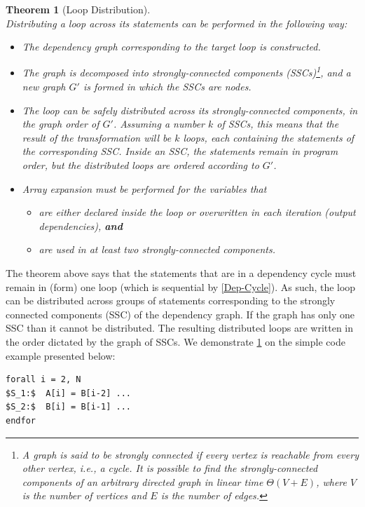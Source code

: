 \documentclass[acmsmall,review]{acmart}\settopmatter{printfolios=true,printccs=false,printacmref=false}
\newtheorem{mytheo}{Theorem}
\begin{document}
\begin{mytheo}[Loop Distribution]\label{Loop-Distrib}
$\mbox{ }$\\
Distributing a loop across its statements can be performed
in the following way:
\begin{itemize}
    \item[1.] The dependency graph corresponding to the target loop
        is constructed.
    \item[2.] The graph is decomposed into strongly-connected components 
            (SSCs)\footnote{
            A graph is said to be strongly connected if every vertex 
            is reachable from every other vertex, i.e., a cycle.
            It is possible to find the strongly-connected components
            of an arbitrary directed graph in linear time $\Theta(V+E)$,
            where $V$ is the number of vertices and $E$ is the number of
            edges.
        }, and a new graph $G'$ is formed in which the SSCs are nodes. 
    \item[3.] The loop can be safely distributed across its strongly-connected
        components, in the graph order of $G'$.
        Assuming a number $k$ of SSCs, this means that the result of the
        transformation will be $k$ loops, each containing the statements
        of the corresponding SSC. Inside an SSC, the statements remain in
        program order, but the distributed loops are ordered according to
        $G'$. 
    \item[4.] Array expansion must be performed for the variables that
        \begin{itemize}
            \item are either declared inside the loop or overwritten
                in each iteration (output dependencies), \textbf{\em and}
            \item are used in at least two strongly-connected components.
        \end{itemize} 
\end{itemize}
\end{mytheo}

The theorem above says that the statements that are in a dependency 
cycle must remain in (form) one loop (which is sequential by 
\cref{Dep-Cycle}). As such, the loop can be distributed across
groups of statements corresponding to the strongly connected 
components (SSC) of the dependency graph. If the graph has only one
SSC than it cannot be distributed.  The resulting distributed loops
are written in the order dictated by the graph of SSCs. 
%
We demonstrate \cref{Loop-Distrib} on the simple code example presented 
below:
\begin{lstlisting}[mathescape=true]
forall i = 2, N
$S_1:$  A[i] = B[i-2] ...
$S_2:$  B[i] = B[i-1] ...
endfor
\end{lstlisting}\vspace{-2ex}
\end{document}
